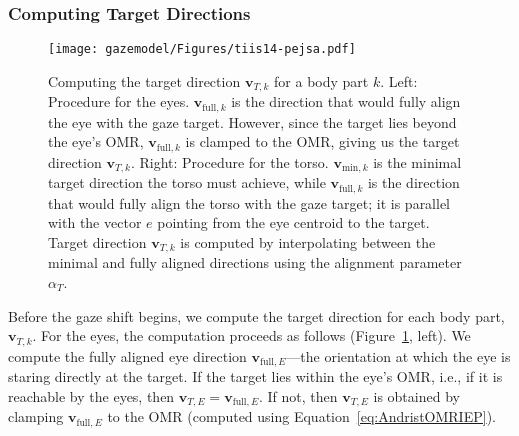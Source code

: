 \subsubsection{Computing Target Directions}
\label{sec:GazeShiftTargetDirections}

\begin{figure}[t]
\centering
\texttt{[image: gazemodel/Figures/tiis14-pejsa.pdf]}
\caption{Computing the target direction $\mathbf{v}_{T,k}$ for a body part $k$. Left: Procedure for the eyes. $\mathbf{v}_{\mathrm{full},k}$ is the direction that would fully align the eye with the gaze target. However, since the target lies beyond the eye's OMR, $\mathbf{v}_{\mathrm{full},k}$ is clamped to the OMR, giving us the target direction $\mathbf{v}_{T,k}$. Right: Procedure for the torso. $\mathbf{v}_{\mathrm{min},k}$ is the minimal target direction the torso must achieve, while $\mathbf{v}_{\mathrm{full},k}$ is the direction that would fully align the torso with the gaze target; it is parallel with the vector $e$ pointing from the eye centroid to the target. Target direction $\mathbf{v}_{T,k}$ is computed by interpolating between the minimal and fully aligned directions using the alignment parameter $\alpha_T$.}
\label{fig:TargetRot}
\end{figure}

Before the gaze shift begins, we compute the target direction for each body part, $\mathbf{v}_{T,k}$. For the eyes, the computation proceeds as follows (Figure~\ref{fig:TargetRot}, left). We compute the fully aligned eye direction $\mathbf{v}_{\mathrm{full},E}$---the orientation at which the eye is staring directly at the target. If the target lies within the eye's OMR, i.e., if it is reachable by the eyes, then $\mathbf{v}_{T,E} = \mathbf{v}_{\mathrm{full},E}$. If not, then $\mathbf{v}_{T,E}$ is obtained by clamping $\mathbf{v}_{\mathrm{full},E}$ to the OMR (computed using Equation~\ref{eq:AndristOMRIEP}).

